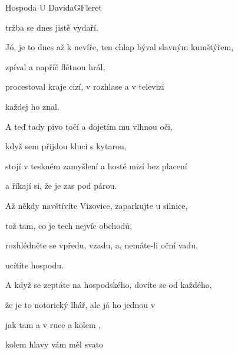 \begin{song}{Hospoda U Davida}{G}{Fleret}
\begin{SBVerse}
tržba se dnes jistě vydaří.
\end{SBVerse}
\begin{SBChorus}
Jó, je to dnes až k nevíře, ten chlap býval slavným kumštýřem,

zpíval a napříč flétnou hrál,

procestoval kraje cizí, v rozhlase a v televizi

každej ho znal.



A teď tady pivo točí a dojetím mu vlhnou oči,

když sem přijdou kluci s kytarou,

stojí v teskném zamyšlení a hosté mizí bez placení

a říkají si, že je zas pod párou.
\end{SBChorus}
\begin{SBVerse}
Až někdy navštívíte Vizovice, zaparkujte u silnice,

tož tam, co je tech nejvíc obchodů,

rozhlédněte se vpředu, vzadu, a, nemáte-li oční vadu,

ucítíte hospodu.

A když se zeptáte na hospodského, dovíte se od každého,

že je to notorický lhář, ale já ho  jednou v 

jak tam  a v ruce  a kolem , 

kolem hlavy vám měl svato
\end{SBVerse}
\begin{SBChorus}
\end{SBChorus}
\end{song}

\pagebreak
